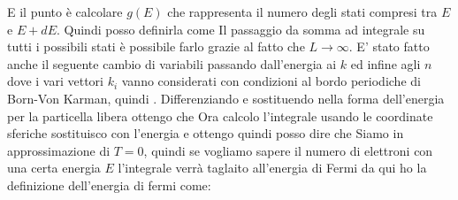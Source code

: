 E il punto è calcolare $g(E)$ che rappresenta il numero degli stati compresi tra $E$ e $E+dE$. Quindi posso definirla come
Il passaggio da somma ad integrale su tutti i possibili stati è possibile farlo grazie al fatto che $L\to\infty$.
E' stato fatto anche il seguente cambio di variabili passando dall'energia ai $k$ ed infine agli $n$
dove i vari vettori $k_i$ vanno considerati con condizioni al bordo periodiche di Born-Von Karman, quindi 
.
Differenziando e sostituendo nella forma dell'energia per la particella libera ottengo che
Ora calcolo l'integrale usando le coordinate sferiche
sostituisco con l'energia e ottengo
quindi posso dire che
Siamo in approssimazione di $T=0$, quindi se vogliamo sapere il numero di elettroni con una certa energia $E$ l'integrale verrà taglaito all'energia di Fermi
da qui ho la definizione dell'energia di fermi come:
